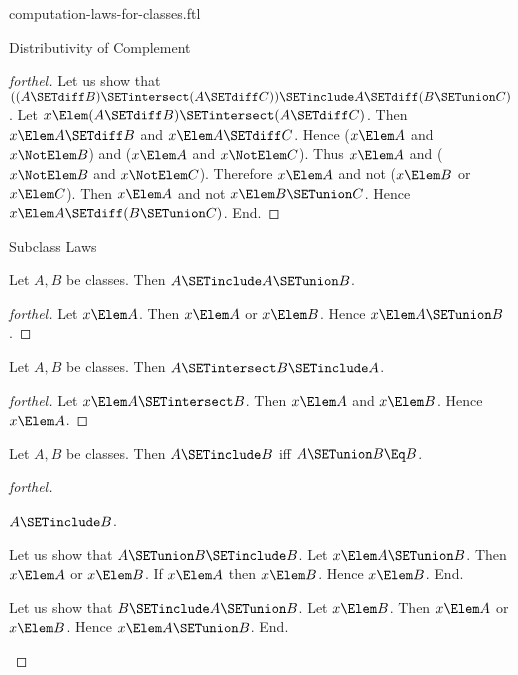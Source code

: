 \documentclass{stex}
\begin{document}
\begin{smodule}{computation-laws-for-classes.ftl}
\begin{sfragment}{Distributivity of Complement}
\begin{proof}[forthel]
    Let us show that $((A \SETdiff B) \SETintersect (A \SETdiff C)) \SETinclude A \SETdiff (B \SETunion C)$. %
      Let $x \Elem (A \SETdiff B) \SETintersect (A \SETdiff C)$.
      Then $x \Elem A \SETdiff B$ and $x \Elem A \SETdiff C$.
      Hence ($x \Elem A$ and $x \NotElem B$) and ($x \Elem A$ and $x \NotElem C$).
      Thus $x \Elem A$ and ($x \NotElem B$ and $x \NotElem C$).
      Therefore $x \Elem A$ and not ($x \Elem B$ or $x \Elem C$).
      Then $x \Elem A$ and not $x \Elem B \SETunion C$.
      Hence $x \Elem A \SETdiff (B \SETunion C)$.
    End.
  \end{proof}
\end{sfragment}

\begin{sfragment}{Subclass Laws}
  \begin{proposition}[forthel]
    Let $A, B$ be classes.
    Then $A \SETinclude A \SETunion B$.
  \end{proposition}
  \begin{proof}[forthel]
    Let $x \Elem A$.
    Then $x \Elem A$ or $x \Elem B$.
    Hence $x \Elem A \SETunion B$.
  \end{proof}

  \begin{proposition}[forthel]
    Let $A, B$ be classes.
    Then $A \SETintersect B \SETinclude A$.
  \end{proposition}
  \begin{proof}[forthel]
    Let $x \Elem A \SETintersect B$.
    Then $x \Elem A$ and $x \Elem B$.
    Hence $x \Elem A$.
  \end{proof}

  \begin{proposition}[forthel]
    Let $A, B$ be classes.
    Then $A \SETinclude B$ iff $A \SETunion B \Eq B$.
  \end{proposition}
  \begin{proof}[forthel]
    \begin{case}{$A \SETinclude B$.}

      Let us show that $A \SETunion B \SETinclude B$.
        Let $x \Elem A \SETunion B$.
        Then $x \Elem A$ or $x \Elem B$.
        If $x \Elem A$ then $x \Elem B$.
        Hence $x \Elem B$.
      End.

      Let us show that $B \SETinclude A \SETunion B$.
        Let $x \Elem B$.
        Then $x \Elem A$ or $x \Elem B$.
        Hence $x \Elem A \SETunion B$.
      End.
    \end{case}


\end{proof}
\end{sfragment}
\end{smodule}
\end{document}
